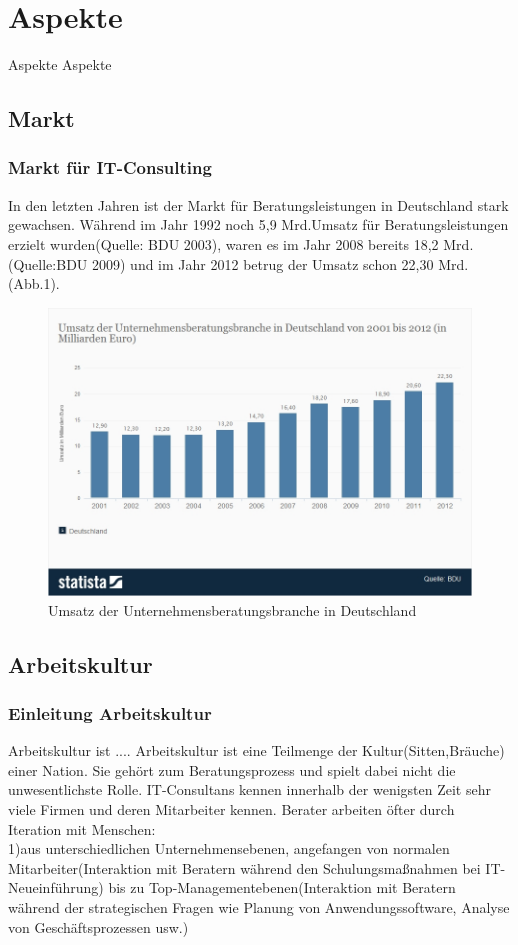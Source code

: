 \chapter{Aspekte}
Aspekte Aspekte
\section{Markt}
	\subsection{Markt für IT-Consulting}
	In den letzten Jahren ist der Markt für Beratungsleistungen in Deutschland stark gewachsen. Während im Jahr 1992 noch 5,9 Mrd.\texteuro Umsatz für Beratungsleistungen erzielt wurden(Quelle: BDU 2003), waren es im Jahr 2008 bereits 18,2 Mrd. \texteuro (Quelle:BDU 2009) und im Jahr 2012 betrug der Umsatz schon 22,30 Mrd. \texteuro (Abb.1).
\begin{figure}[htp]
\centering
\includegraphics[width=0.7\linewidth]{./images/umsatz-der-unternehmensberatungsbranche-in-deutschland}
\caption{Umsatz der Unternehmensberatungsbranche in Deutschland}
\label{fig:umsatz_UBer}
\end{figure}


\section{Arbeitskultur}
	\subsection{Einleitung Arbeitskultur}
Arbeitskultur ist ....
Arbeitskultur ist eine Teilmenge der Kultur(Sitten,Bräuche) einer Nation. Sie gehört zum Beratungsprozess und spielt dabei nicht die unwesentlichste Rolle. IT-Consultans kennen innerhalb der wenigsten Zeit sehr viele Firmen und deren Mitarbeiter kennen. Berater arbeiten öfter durch Iteration mit Menschen:\\
1)aus unterschiedlichen Unternehmensebenen, angefangen von normalen Mitarbeiter(Interaktion mit Beratern während den Schulungsmaßnahmen bei IT-Neueinführung) bis zu Top-Managementebenen(Interaktion mit Beratern während der strategischen Fragen wie Planung von Anwendungssoftware, Analyse von Geschäftsprozessen usw.)\\

